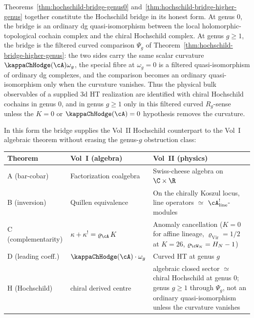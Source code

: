 \begin{remark}
Theorems~\ref{thm:hochschild-bridge-genus0}
and~\ref{thm:hochschild-bridge-higher-genus} together constitute
the Hochschild bridge in its honest form.  At genus \(0\), the bridge
is an ordinary dg quasi-isomorphism between the local
holomorphic-topological cochain complex and the chiral Hochschild
complex.  At genus \(g\geq1\), the bridge is the filtered curved
comparison
\(\Psi_g\) of
Theorem~\ref{thm:hochschild-bridge-higher-genus}: the two sides carry
the same scalar curvature
\(\kappaChHodge(\cA)\omega_g\), the special fibre at
\(\omega_g=0\) is a filtered quasi-isomorphism of ordinary dg
complexes, and the comparison becomes an ordinary quasi-isomorphism
only when the curvature vanishes.  Thus the physical bulk observables
of a supplied 3d HT realization are identified with chiral Hochschild
cochains in genus \(0\), and in genus \(g\geq1\) only in this filtered
curved \(R_g\)-sense unless the \(K=0\) or
\(\kappaChHodge(\cA)=0\) hypothesis removes the curvature.

In this form the bridge supplies the Vol~II Hochschild counterpart to
the Vol~I algebraic theorem without erasing the genus-\(g\) obstruction
class:
\begin{center}
\renewcommand{\arraystretch}{1.2}
\begin{tabular}{lll}
\textbf{Theorem} & \textbf{Vol~I (algebra)} &
 \textbf{Vol~II (physics)} \\
\hline
A (bar-cobar) & Factorization coalgebra &
 Swiss-cheese algebra on $\C \times \R$ \\
B (inversion) & Quillen equivalence &
 On the chirally Koszul locus, line operators $\simeq$
 $\cA^!_{\mathrm{line}}$-modules \\
C (complementarity) & $\kappa + \kappa^! = \varrho_{\cA}\,K$ &
 Anomaly cancellation ($K = 0$ for affine lineage,
 $\varrho_{\mathrm{Vir}} = 1/2$ at $K = 26$,
 $\varrho_{\cW_N} = H_N - 1$) \\
D (leading coeff.) & $\kappaChHodge(\cA) \cdot \omega_g$ &
 Curved HT at genus $g$ \\
H (Hochschild) & chiral derived centre &
 algebraic closed sector $\simeq$ chiral Hochschild at genus \(0\);
 genus \(g\geq1\) through \(\Psi_g\), not an ordinary
 quasi-isomorphism unless the curvature vanishes
\end{tabular}
\end{center}
\end{remark}

